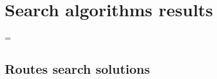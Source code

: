 \chapter{Search algorithms results}
\label{app:reg}

\LTcapwidth=\textwidth


\let\oldlongtable\longtable
\let\endoldlongtable\endlongtable

\def\zza{\global\let\zz\zzb
\fullwidthcolor{lightgray}}%

\def\zzb{\global\let\zz\zza}

\def\fullwidthcolor#1{\color{#1}\leaders\vrule\hskip\textwidth\hskip-\textwidth\kern0pt}
\def\resetLTcolor{\global\let\zz\zza}


\section{Routes search solutions}

